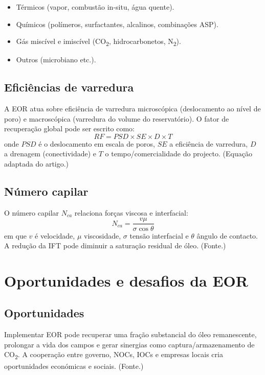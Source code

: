 \documentclass[11pt,a4paper]{article}
\begin{document}
\begin{itemize}[noitemsep]
	\item Térmicos (vapor, combustão in-situ, água quente).
	\item Químicos (polímeros, surfactantes, alcalinos, combinações ASP).
	\item Gás miscível e imiscível (CO\textsubscript{2}, hidrocarbonetos, N\textsubscript{2}).
	\item Outros (microbiano etc.).
\end{itemize}

\subsection{Eficiências de varredura}
A EOR atua sobre eficiência de varredura microscópica (deslocamento ao nível de poro) e macroscópica (varredura do volume do reservatório). O fator de recuperação global pode ser escrito como:
\begin{equation}
RF = PSD \times SE \times D \times T
\end{equation}
onde $PSD$ é o deslocamento em escala de poros, $SE$ a eficiência de varredura, $D$ a drenagem (conectividade) e $T$ o tempo/comercialidade do projecto. (Equação adaptada do artigo.)

\subsection{Número capilar}
O número capilar $N_{ca}$ relaciona forças viscosa e interfacial:
\begin{equation}
N_{ca} = \frac{v \mu}{\sigma \cos\theta}
\end{equation}
em que $v$ é velocidade, $\mu$ viscosidade, $\sigma$ tensão interfacial e $\theta$ ângulo de contacto. A redução da IFT pode diminuir a saturação residual de óleo. (Fonte.)

\section{Oportunidades e desafios da EOR}
\subsection{Oportunidades}
Implementar EOR pode recuperar uma fração substancial do óleo remanescente, prolongar a vida dos campos e gerar sinergias como captura/armazenamento de CO\textsubscript{2}. A cooperação entre governo, NOCs, IOCs e empresas locais cria oportunidades económicas e sociais. (Fonte.)
\end{document}
